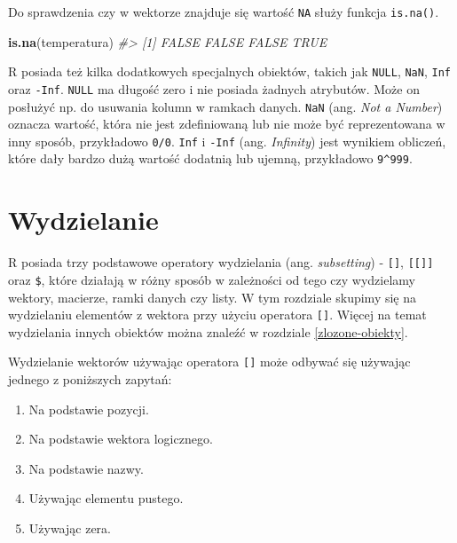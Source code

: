 \documentclass[paper=6in:9in,pagesize=pdftex,headinclude=on,footinclude=on,10pt]{scrbook}
\makeatletter
\newenvironment{Shaded}{\begin{snugshade}}{\end{snugshade}}
\newcommand{\CommentTok}[1]{\textcolor[rgb]{0.56,0.35,0.01}{\textit{#1}}}
\newcommand{\KeywordTok}[1]{\textcolor[rgb]{0.13,0.29,0.53}{\textbf{#1}}}
\newcommand{\NormalTok}[1]{#1}
\providecommand{\tightlist}{%
  \setlength{\itemsep}{0pt}\setlength{\parskip}{0pt}}
\newenvironment{kframe}{%
\medskip{}
\setlength{\fboxsep}{.8em}
 \def\at@end@of@kframe{}%
 \ifinner\ifhmode%
  \def\at@end@of@kframe{\end{minipage}}%
  \begin{minipage}{\columnwidth}%
 \fi\fi%
 \def\FrameCommand##1{\hskip\@totalleftmargin \hskip-\fboxsep
 \colorbox{shadecolor}{##1}\hskip-\fboxsep
     \hskip-\linewidth \hskip-\@totalleftmargin \hskip\columnwidth}%
 \MakeFramed {\advance\hsize-\width
   \@totalleftmargin\z@ \linewidth\hsize
   \@setminipage}}%
 {\par\unskip\endMakeFramed%
 \at@end@of@kframe}
\newenvironment{rmdblock}[1]
  {
  \begin{itemize}
  \renewcommand{\labelitemi}{
    \raisebox{-.7\height}[0pt][0pt]{
      {\setkeys{Gin}{width=3em,keepaspectratio}\texttt{[image: images/\#1]}}
    }
  }
  \setlength{\fboxsep}{1em}
  \begin{kframe}
  \item
  }
  {
  \end{kframe}
  \end{itemize}
  }
\newenvironment{rmdinfo}
  {\begin{rmdblock}{compass}}
  {\end{rmdblock}}
\makeatother
\begin{document}
Do sprawdzenia czy w wektorze znajduje się wartość \texttt{NA} służy funkcja \texttt{is.na()}.

\begin{Shaded}
\begin{Highlighting}[]
\KeywordTok{is.na}\NormalTok{(temperatura)}
\CommentTok{#> [1] FALSE FALSE FALSE  TRUE}
\end{Highlighting}
\end{Shaded}

\begin{rmdinfo}
R posiada też kilka dodatkowych specjalnych obiektów, takich jak \texttt{NULL}, \texttt{NaN}, \texttt{Inf} oraz \texttt{-Inf}.
\texttt{NULL} ma długość zero i nie posiada żadnych atrybutów.
Może on posłużyć np. do usuwania kolumn w ramkach danych.
\texttt{NaN} (ang. \emph{Not a Number}) oznacza wartość, która nie jest zdefiniowaną lub nie może być reprezentowana w inny sposób, przykładowo \texttt{0/0}.
\texttt{Inf} i \texttt{-Inf} (ang. \emph{Infinity}) jest wynikiem obliczeń, które dały bardzo dużą wartość dodatnią lub ujemną, przykładowo \texttt{9\^{}999}.
\end{rmdinfo}

\hypertarget{wydzielanie}{%
\section{Wydzielanie}\label{wydzielanie}}

R posiada trzy podstawowe operatory wydzielania (ang. \emph{subsetting}) - \texttt{{[}{]}}, \texttt{{[}{[}{]}{]}} oraz \texttt{\$}, które działają w różny sposób w zależności od tego czy wydzielamy wektory, macierze, ramki danych czy listy.
W tym rozdziale skupimy się na wydzielaniu elementów z wektora przy użyciu operatora \texttt{{[}{]}}.
Więcej na temat wydzielania innych obiektów można znaleźć w rozdziale \ref{zlozone-obiekty}.

Wydzielanie wektorów używając operatora \texttt{{[}{]}} może odbywać się używając jednego z poniższych zapytań:

\begin{enumerate}
\def\labelenumi{\arabic{enumi}.}
\tightlist
\item
  Na podstawie pozycji.
\item
  Na podstawie wektora logicznego.
\item
  Na podstawie nazwy.
\item
  Używając elementu pustego.
\item
  Używając zera.
\end{enumerate}
\end{document}
